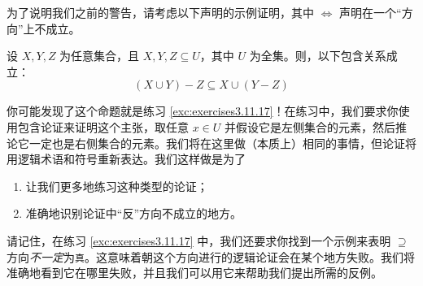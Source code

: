 为了说明我们之前的警告，请考虑以下声明的示例证明，其中 $\iff$ 声明在一个``方向''上不成立。

\begin{proposition}\label{prop:proposition4.6.11}
    设 $X, Y, Z$ 为任意集合，且 $X, Y, Z \subseteq U$，其中 $U$ 为全集。则，以下包含关系成立：
    \[(X \cup Y ) - Z \subseteq X \cup (Y - Z)\]
\end{proposition}

你可能发现了这个命题就是练习 \ref{exc:exercises3.11.17}！在练习中，我们要求你使用包含论证来证明这个主张，取任意 $x \in U$ 并假设它是左侧集合的元素，然后推论它一定也是右侧集合的元素。我们将在这里做（本质上）相同的事情，但论证将用逻辑术语和符号重新表达。我们这样做是为了
\begin{enumerate}
    \item 让我们更多地练习这种类型的论证；
    \item 准确地识别论证中``反''方向不成立的地方。 
\end{enumerate}
请记住，在练习 \ref{exc:exercises3.11.17} 中，我们还要求你找到一个示例来表明 $\supseteq$ 方向\emph{不一定}为\verb|真|。这意味着朝这个方向进行的逻辑论证会在某个地方失败。我们将准确地看到它在哪里失败，并且我们可以用它来帮助我们提出所需的反例。

